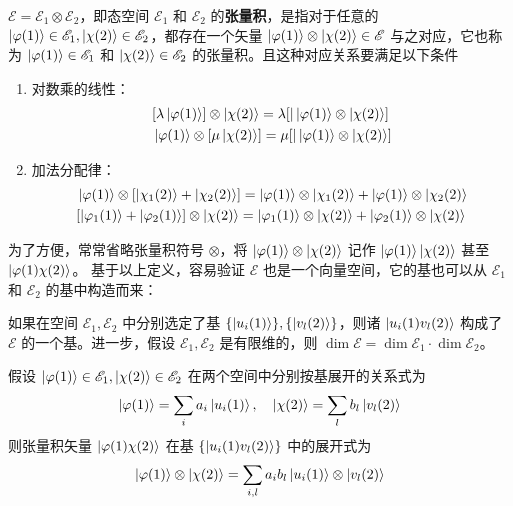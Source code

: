 \documentclass[cn,10pt,math=newtx,citestyle=gb7714-2015,bibstyle=gb7714-2015]{elegantbook}
\def\ms{\mathscr}
\def\vphi{\varphi}
\def\ox{\otimes}
\begin{document}
\begin{definition}[张量积]
    $\ms E=\ms E_1\ox \ms E_2$，即态空间 $\ms E_1$ 和 $\ms E_2$ 的\textbf{张量积}，是指对于任意的 $\ket{\vphi(1)}\in\ms E_1,\ket{\chi(2)}\in\ms E_2$，都存在一个矢量 $\ket{\vphi(1)}\ox\ket{\chi(2)}\in\ms E$ 与之对应，它也称为 $\ket{\vphi(1)}\in\ms E_1$ 和 $\ket{\chi(2)}\in\ms E_2$ 的张量积。且这种对应关系要满足以下条件
   \begin{enumerate}
       \item 对数乘的线性：
       \begin{align}
           & [\lambda\ket{\vphi(1)}]\ox\ket{\chi(2)} = \lambda[|\ket{\vphi(1)}\ox\ket{\chi(2)}]\\
           & \ket{\vphi(1)}\ox[\mu\ket{\chi(2)}] = \mu[|\ket{\vphi(1)}\ox\ket{\chi(2)}]
       \end{align}
       \item 加法分配律：
       \begin{align}
           & \ket{\vphi(1)}\ox[\ket{\chi_1(2)}+\ket{\chi_2(2)}] = \ket{\vphi(1)}\ox\ket{\chi_1(2)}+\ket{\vphi(1)}\ox\ket{\chi_2(2)}\\
           & [\ket{\vphi_1(1)}+\ket{\vphi_2(1)}]\ox\ket{\chi(2)} = \ket{\vphi_1(1)}\ox\ket{\chi(2)}+\ket{\vphi_2(1)}\ox\ket{\chi(2)}
       \end{align}
   \end{enumerate}
\end{definition}

为了方便，常常省略张量积符号 $\ox$，将 $\ket{\vphi(1)}\ox\ket{\chi(2)}$ 记作 $\ket{\vphi(1)}\ket{\chi(2)}$ 甚至 $\ket{\vphi(1)\chi(2)}$。 基于以上定义，容易验证 $\ms E$ 也是一个向量空间，它的基也可以从 $\ms E_1$ 和 $\ms E_2$ 的基中构造而来：

\begin{theorem}[张量积空间的基]
   如果在空间 $\ms E_1,\ms E_2$ 中分别选定了基 $\{\ket{u_i(1)}\},\{\ket{v_l(2)}\}$，则诸 $\ket{u_i(1)v_l(2)}$ 构成了 $\ms E$ 的一个基。进一步，假设 $\ms E_1,\ms E_2$ 是有限维的，则 $\dim \ms E = \dim \ms E_1\cdot \dim \ms E_2$。
\end{theorem}

\begin{corollary}[张量积矢量在张量积空间中按基展开]\label{col:tnsr_prdct_vctr_expnsn}
    假设 $\ket{\vphi(1)}\in\ms E_1,\ket{\chi(2)}\in\ms E_2$ 在两个空间中分别按基展开的关系式为
    \begin{equation*}
        \ket{\vphi(1)} = \sum_i a_i\ket{u_i(1)},\quad \ket{\chi(2)} = \sum_l b_l\ket{v_l(2)}
    \end{equation*}
    则张量积矢量 $\ket{\vphi(1)\chi(2)}$ 在基 $\{\ket{u_i(1)v_l(2)}\}$ 中的展开式为
    \begin{equation}
        \ket{\vphi(1)}\ox\ket{\chi(2)} = \sum_{i,l} a_i b_l\ket{u_i(1)}\ox\ket{v_l(2)}
    \end{equation}
    
\end{corollary}
\end{document}
